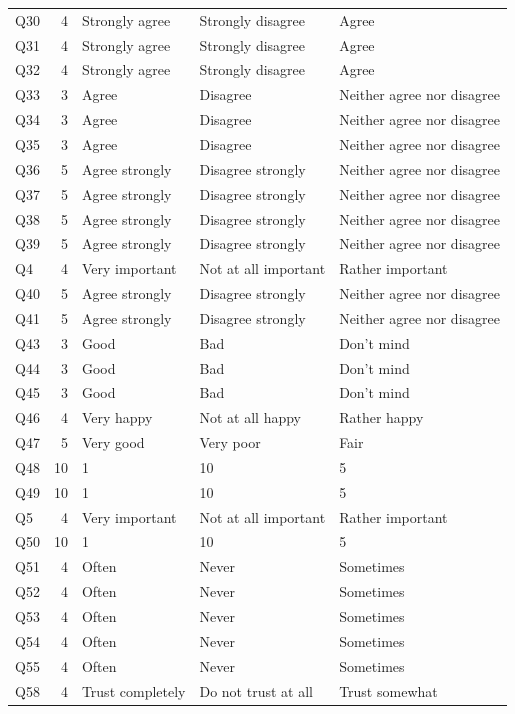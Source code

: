 \begin{longtable}{l r l l l}
Q30 & 4 & Strongly agree & Strongly disagree & Agree \\
Q31 & 4 & Strongly agree & Strongly disagree & Agree \\
Q32 & 4 & Strongly agree & Strongly disagree & Agree \\
Q33 & 3 & Agree & Disagree & Neither agree nor disagree \\
Q34 & 3 & Agree & Disagree & Neither agree nor disagree \\
Q35 & 3 & Agree & Disagree & Neither agree nor disagree \\
Q36 & 5 & Agree strongly & Disagree strongly & Neither agree nor disagree \\
Q37 & 5 & Agree strongly & Disagree strongly & Neither agree nor disagree \\
Q38 & 5 & Agree strongly & Disagree strongly & Neither agree nor disagree \\
Q39 & 5 & Agree strongly & Disagree strongly & Neither agree nor disagree \\
Q4 & 4 & Very important & Not at all important & Rather important \\
Q40 & 5 & Agree strongly & Disagree strongly & Neither agree nor disagree \\
Q41 & 5 & Agree strongly & Disagree strongly & Neither agree nor disagree \\
Q43 & 3 & Good & Bad & Don't mind \\
Q44 & 3 & Good & Bad & Don't mind \\
Q45 & 3 & Good & Bad & Don't mind \\
Q46 & 4 & Very happy & Not at all happy & Rather happy \\
Q47 & 5 & Very good & Very poor & Fair \\
Q48 & 10 & 1 & 10 & 5 \\
Q49 & 10 & 1 & 10 & 5 \\
Q5 & 4 & Very important & Not at all important & Rather important \\
Q50 & 10 & 1 & 10 & 5 \\
Q51 & 4 & Often & Never & Sometimes \\
Q52 & 4 & Often & Never & Sometimes \\
Q53 & 4 & Often & Never & Sometimes \\
Q54 & 4 & Often & Never & Sometimes \\
Q55 & 4 & Often & Never & Sometimes \\
Q58 & 4 & Trust completely & Do not trust at all & Trust somewhat \\

\end{longtable}

